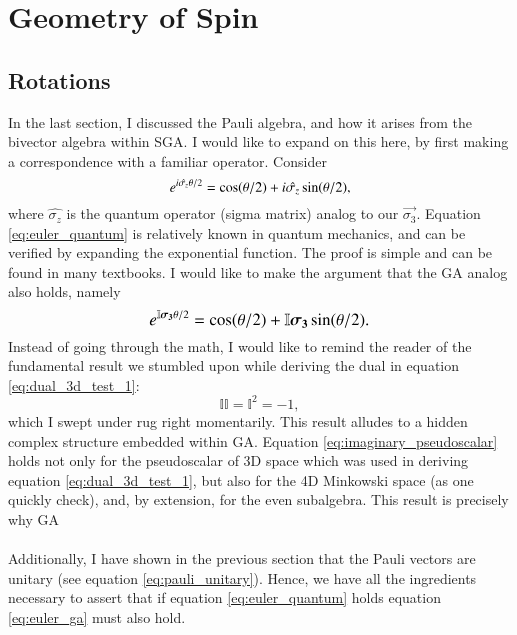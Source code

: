 

\section{Geometry of Spin}

\subsection{Rotations}
In the last section, I discussed the Pauli algebra, and how it arises from the bivector algebra within SGA. I would like to expand on this here, by first making a correspondence with a familiar operator. Consider
\begin{equation} \label{eq:euler_quantum}
	\large  \exp{i \hat{\sigma_z} \theta / 2} = \cos(\theta/2) + i \hat{\sigma_z} \sin(\theta/2),
\end{equation}
where $\hat{\sigma_z} $ is the quantum operator (sigma matrix) analog to our $\vec{\sigma_3}$. Equation \eqref{eq:euler_quantum} is relatively known in quantum mechanics, and can be verified by expanding the exponential function. The proof is simple and can be found in many textbooks. I would like to make the argument that the GA analog also holds, namely
\begin{equation} \label{eq:euler_ga}
	\large  \exp{ \mathbb{I} \vec{\sigma_3} \theta / 2} = \cos(\theta/2) + \mathbb{I} \vec{\sigma_3} \sin(\theta/2).
\end{equation}
Instead of going through the math, I would like to remind the reader of the fundamental result we stumbled upon while deriving the dual in equation \eqref{eq:dual_3d_test_1}:
\begin{equation} \label{eq:imaginary_pseudoscalar}
	\mathbb{I}  \mathbb{I} = \mathbb{I} ^2 = -1,
\end{equation}
which I swept under rug right momentarily. This result alludes to a hidden complex structure embedded within GA. Equation \eqref{eq:imaginary_pseudoscalar} holds not only for the pseudoscalar of 3D space which was used in deriving equation \eqref{eq:dual_3d_test_1}, but also for the 4D Minkowski space (as one quickly check), and, by extension, for the even subalgebra. This result is precisely why GA
\\ \\
Additionally, I have shown in the previous section that the Pauli vectors are unitary (see equation \eqref{eq:pauli_unitary}). Hence, we have all the ingredients necessary to assert that if equation \eqref{eq:euler_quantum} holds equation \eqref{eq:euler_ga} must also hold.
